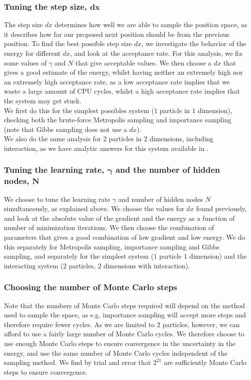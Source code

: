\documentclass[a4paper, 10pt]{article}
\begin{document}
	\subsubsection{Tuning the step size, $\boldsymbol{dx}$}
	The step size $dx$ determines how well we are able to sample the position space, as it describes how far our proposed next position should be from the previous position. To find the best possible step size $dx$, we investigate the behavior of the energy for different $dx$, and look at the acceptance rate. For this analysis, we fix some values of $\gamma$ and $N$ that give acceptable values. We then choose a $dx$ that gives a good estimate of the energy, whilst having neither an extremely high nor an extremely high acceptance rate, as a low acceptance rate implies that we waste a large amount of CPU cycles, whilst a high acceptance rate implies that the system may get stuck.\\
	\linebreak
	We first do this for the simplest possibles system ($1$ particle in $1$ dimension), checking both the brute-force Metropolis sampling and importance sampling (note that Gibbs sampling does not use a $dx$).\\
	\linebreak
	We also do the same analysis for $2$ particles in $2$ dimensions, including interaction, as we have analytic answers for this system available in \cite{0305-4470-27-3-040}.
	\subsubsection{Tuning the learning rate, $\boldsymbol{\gamma}$ and the number of hidden nodes, $\boldsymbol{N}$}\label{sec:Met_tuning_gamma_N}
	We choose to tune the learning rate $\gamma$ and number of hidden nodes $N$ simultaneously, as explained above. We choose the values for $dx$ found previously, and look at the absolute value of the gradient and the energy as a function of number of minimization iterations. We then choose the combination of parameters that gives a good combination of low gradient and low energy. We do this separately for Metropolis sampling, importance sampling and Gibbs sampling, and separately for the simplest system ($1$ particle $1$ dimension) and the interacting system ($2$ particles, $2$ dimensions with interaction).
	\subsubsection{Choosing the number of Monte Carlo steps}
	Note that the numbers of Monte Carlo steps required will depend on the method used to sample the space, as e.g. importance sampling will accept more steps and therefore require fewer cycles. As we are limited to $2$ particles, however, we can afford to use a fairly large number of Monte Carlo cycles. We therefore choose to use enough Monte Carlo steps to ensure convergence in the uncertainty in the energy, and use the same number of Monte Carlo cycles independent of the sampling method. We find by trial and error that $2^{21}$ are sufficiently Monte Carlo steps to ensure convergence.
\end{document}
